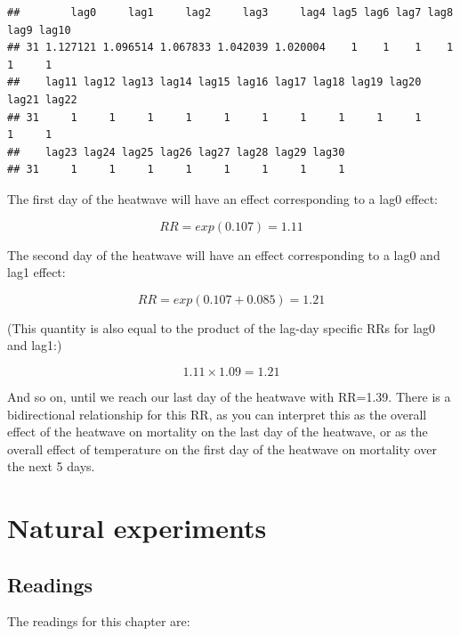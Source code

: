 \documentclass[
]{book}
\newenvironment{Shaded}{\begin{snugshade}}{\end{snugshade}}
\newcommand{\CommentTok}[1]{\textcolor[rgb]{0.56,0.35,0.01}{\textit{#1}}}
\newcommand{\NormalTok}[1]{#1}
\newcommand{\OperatorTok}[1]{\textcolor[rgb]{0.81,0.36,0.00}{\textbf{#1}}}
\begin{document}
\begin{Shaded}
\end{Shaded}

\begin{verbatim}
##        lag0     lag1     lag2     lag3     lag4 lag5 lag6 lag7 lag8 lag9 lag10
## 31 1.127121 1.096514 1.067833 1.042039 1.020004    1    1    1    1    1     1
##    lag11 lag12 lag13 lag14 lag15 lag16 lag17 lag18 lag19 lag20 lag21 lag22
## 31     1     1     1     1     1     1     1     1     1     1     1     1
##    lag23 lag24 lag25 lag26 lag27 lag28 lag29 lag30
## 31     1     1     1     1     1     1     1     1
\end{verbatim}

The first day of the heatwave will have an effect corresponding to a lag0 effect:

\[
RR=exp(0.107)=1.11
\]

The second day of the heatwave will have an effect corresponding to a lag0 and lag1 effect:

\[
RR = exp(0.107 + 0.085) = 1.21
\]

(This quantity is also equal to the product of the lag-day specific RRs for lag0 and lag1:)

\[
1.11 \times 1.09 = 1.21
\]

And so on, until we reach our last day of the heatwave with RR=1.39. There is a bidirectional relationship for this RR, as you can interpret this as the overall effect of the heatwave on mortality on the last day of the heatwave, or as the overall effect of temperature on the first day of the heatwave on mortality over the next 5 days.

\hypertarget{natural-experiments}{%
\chapter{Natural experiments}\label{natural-experiments}}

\hypertarget{readings-2}{%
\section{Readings}\label{readings-2}}

The readings for this chapter are:
\end{document}
